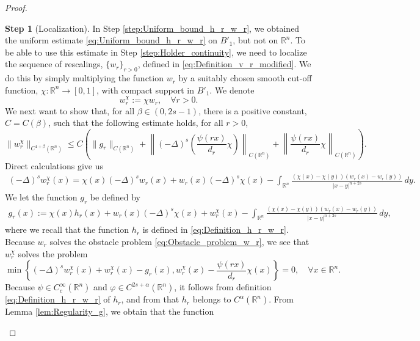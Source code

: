 \documentclass[11pt,reqno]{amsart}
\theoremstyle{definition}
\newtheorem{step}{Step}
\theoremstyle{remark}
\begin{document}
\begin{proof}
\begin{step}[Localization]
\label{step:Localization_w_r}
In Step \ref{step:Uniform_bound_h_r_w_r}, we obtained the uniform estimate \eqref{eq:Uniform_bound_h_r_w_r} on $B'_1$, but not on ${\mathbb{R}}^n$. To be able to use this estimate in Step \ref{step:Holder_continuity}, we need to localize the sequence of rescalings, $\{w_r\}_{r>0}$, defined in \eqref{eq:Definition_v_r_modified}. We do this by simply multiplying the function $w_r$ by a suitably chosen smooth cut-off function, $\chi:{\mathbb{R}}^n\rightarrow [0,1]$, with compact support in $B'_1$. We denote
\begin{equation}
\label{eq:Definition_w_r_cutoff}
w^{\chi}_r:=\chi w_r ,\quad\forall r>0.
\end{equation}
We next want to show that, for all $\beta\in (0,2s-1)$, there is a positive constant, $C=C(\beta)$, such that the following estimate holds, for all $r>0$,
\begin{equation}
\label{eq:Schauder_estimate_w_r_cutoff}
\|w^{\chi}_r\|_{C^{1+\beta}({\mathbb{R}}^n)} \leq C\left(\|g_r\|_{C({\mathbb{R}}^n)}+\left\|(-\Delta)^s\left(\frac{\psi(rx)}{d_r}\chi\right)\right\|_{C({\mathbb{R}}^n)}+\left\|\frac{\psi(rx)}{d_r}\chi\right\|_{C({\mathbb{R}}^n)}\right).
\end{equation}
Direct calculations give us
\begin{align*}
(-\Delta)^s w^{\chi}_r(x) = \chi(x)(-\Delta)^s w_r(x) + w_r(x) (-\Delta)^s\chi(x)-\int_{{\mathbb{R}}^n}\frac{(\chi(x)-\chi(y))(w_r(x)-w_r(y))}{|x-y|^{n+2s}}\, dy.
\end{align*}
We let the function $g_r$ be defined by
\begin{align}
\label{eq:Definition_g_r}
g_r(x):= \chi(x)h_r(x)+ w_r(x) (-\Delta)^s\chi(x)+ w^{\chi}_r(x)-\int_{{\mathbb{R}}^n}\frac{(\chi(x)-\chi(y))(w_r(x)-w_r(y))}{|x-y|^{n+2s}}\, dy,
\end{align}
where we recall that the function $h_r$ is defined in \eqref{eq:Definition_h_r_w_r}. Because $w_r$ solves the obstacle problem \eqref{eq:Obstacle_problem_w_r}, we see that $w^{\chi}_r$ solves the problem
\begin{equation*}
\min\left\{(-\Delta)^s w^{\chi}_r(x) +w^{\chi}_r(x) - g_r(x), w^{\chi}_r(x)-\frac{\psi(rx)}{d_r}\chi(x)\right\}=0,\quad\forall x\in {\mathbb{R}}^n.
\end{equation*}
Because $\psi \in C^{\infty}_c({\mathbb{R}}^n)$ and $\varphi\in C^{2s+\alpha}({\mathbb{R}}^n)$, it follows from definition \eqref{eq:Definition_h_r_w_r} of $h_r$, and from \cite[Proposition 2.6]{Silvestre_2007} that $h_r$ belongs to $C^{\alpha}({\mathbb{R}}^n)$. From Lemma \ref{lem:Regularity_g}, we obtain that the function

\end{step}
\end{proof}
\end{document}
